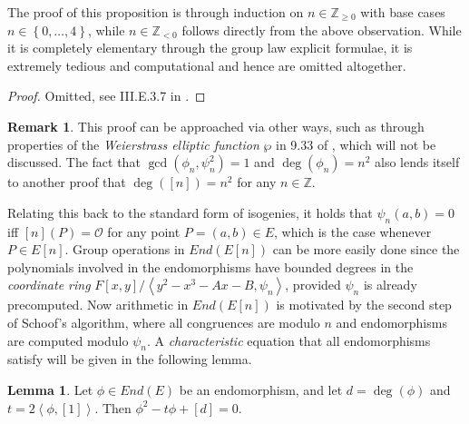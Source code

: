 \documentclass{article}
\newcommand{\Z}{\mathbb{Z}}
\newcommand{\rb}[1]{\left( #1 \right)}
\renewcommand{\sb}[1]{\left[ #1 \right]}
\newcommand{\cb}[1]{\left\{ #1 \right\}}
\newcommand{\ab}[1]{\left\langle #1 \right\rangle}
\theoremstyle{definition}\newtheorem*{definition}{Definition}
\theoremstyle{definition}\newtheorem*{example}{Example}
\theoremstyle{definition}\newtheorem*{remark}{Remark}
\newtheorem{lemma}[proposition]{Lemma}
\begin{document}
The proof of this proposition is through induction on $ n \in \Z_{\ge 0} $ with base cases $ n \in \cb{0, \dots, 4} $, while $ n \in \Z_{< 0} $ follows directly from the above observation. While it is completely elementary through the group law explicit formulae, it is extremely tedious and computational and hence are omitted altogether.

\begin{proof}
Omitted, see III.E.3.7 in \cite{gtm}.
\end{proof}

\begin{remark}
This proof can be approached via other ways, such as through properties of the \emph{Weierstrass elliptic function} $ \wp $ in 9.33 of \cite{crypto}, which will not be discussed. The fact that $ \gcd\rb{\phi_n, \psi_n^2} = 1 $ and $ \deg\rb{\phi_n} = n^2 $ also lends itself to another proof that $ \deg\rb{\sb{n}} = n^2 $ for any $ n \in \Z $.
\end{remark}

Relating this back to the standard form of isogenies, it holds that $ \psi_n\rb{a, b} = 0 $ iff $ \sb{n}\rb{P} = \mathcal{O} $ for any point $ P = \rb{a, b} \in E $, which is the case whenever $ P \in E\sb{n} $. Group operations in $ End\rb{E\sb{n}} $ can be more easily done since the polynomials involved in the endomorphisms have bounded degrees in the \emph{coordinate ring} $ F\sb{x, y} / \ab{y^2 - x^3 - Ax - B, \psi_n} $, provided $ \psi_n $ is already precomputed. Now arithmetic in $ End\rb{E\sb{n}} $ is motivated by the second step of Schoof's algorithm, where all congruences are modulo $ n $ and endomorphisms are computed modulo $ \psi_n $. A \emph{characteristic} equation that all endomorphisms satisfy will be given in the following lemma.

\begin{lemma}
Let $ \phi \in End\rb{E} $ be an endomorphism, and let $ d = \deg\rb{\phi} $ and $ t = 2\ab{\phi, \sb{1}} $. Then $ \phi^2 - t\phi + \sb{d} = 0 $.
\end{lemma}
\end{document}
